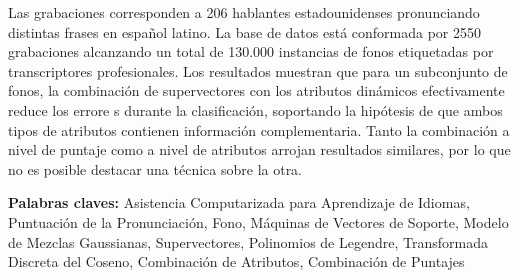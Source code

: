 Las grabaciones corresponden a 206 hablantes estadounidenses pronunciando distintas
frases en español latino. La base de datos está conformada por 2550 grabaciones alcanzando
un total de 130.000 instancias de fonos etiquetadas
por transcriptores profesionales.
Los resultados muestran que para un subconjunto de fonos, la combinación de supervectores
con los atributos dinámicos efectivamente reduce los errore s durante la clasificación,
soportando la
hipótesis de que ambos tipos de atributos contienen información complementaria.
Tanto la combinación a nivel de puntaje como a nivel de atributos
arrojan resultados similares, por
lo que no es posible destacar una técnica sobre la otra.

\bigskip

\noindent\textbf{Palabras claves:} Asistencia Computarizada para Aprendizaje de Idiomas, Puntuación de la Pronunciación, Fono, Máquinas de Vectores de Soporte, Modelo de Mezclas Gaussianas, Supervectores, Polinomios de Legendre, Transformada Discreta del Coseno, Combinación de Atributos, Combinación de Puntajes

